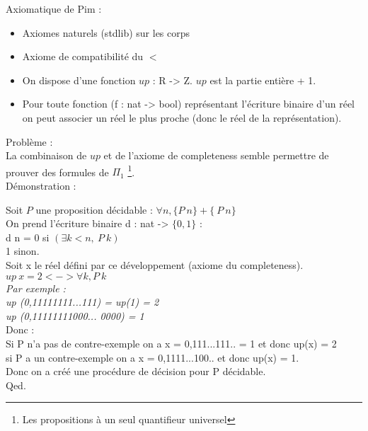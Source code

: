 \documentclass[a4paper,11pt]{article}
\begin{document}
Axiomatique de Pim : 
\begin{itemize}
\item Axiomes naturels (stdlib) sur les corps
\item Axiome de compatibilité du $<$
\item On dispose d'une fonction $up$ : R -> Z. $up$ est la partie entière + 1.
\item Pour toute fonction (f : nat -> bool) représentant l'écriture binaire d'un réel on peut 
associer un réel le plus proche (donc le réel de la représentation).
\end{itemize}


Problème : \\

La combinaison de $up$ et de l'axiome de completeness semble permettre de prouver des formules de $\Pi_1$ 
\footnote{Les propositions à un seul quantifieur universel}.\\

Démonstration :

Soit $P$ une proposition décidable : $\forall n, \{ P \ n \} + \{~P\ n\}$\\
On prend l'écriture binaire d : nat -> $\{ 0, 1 \}$ :\\
d n = 
0 si $(\exists k < n, ~P \ k)$ \\
1 sinon.\\

Soit x le réel défini par ce développement (axiome du completeness).\\

$up \ x = 2 <-> \forall k, P \ k$\\
\emph{Par exemple : \\
up (0,11111111...111) = up(1) = 2\\
up (0,11111111000... 0000) = 1\\
}
Donc :\\
Si P n'a pas de contre-exemple on a x = 0,111...111.. = 1 et donc up(x) = 2 \\ 
si P a un contre-exemple on a x = 0,1111...100.. et donc up(x) = 1. \\

Donc on a créé une procédure de décision pour P décidable.\\

Qed.
\end{document}

